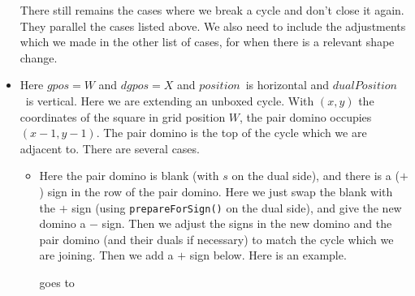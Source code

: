 \documentclass[12pt]{article}
\numberwithin{equation}{section}
\newcommand{\horizontalDominoRSShift}[4]{\filldraw [dominoRSStyle] (#2 - 1 + #4 + \eps, #1 - 1 + \eps) rectangle + (2 - \teps, 1 -\teps) node [dominoText] {$#3$};}
\newcommand{\verticalDominoRSShift}[4]{\filldraw [dominoRSStyle] (#2 - 1 + #4 + \eps,  #1 - 1 + \eps) rectangle + (1 - \teps,2 -\teps) node [dominoText] {$#3$};}
\newcommand{\pos}{$position$}
\newcommand{\dpos}{$dualPosition$}
\begin{document}
\begin{itemize}
    There still remains the cases where we break a cycle and don't close it again.
    They parallel the cases listed above.
    We also need to include the adjustments which we made in the other list of cases, for when there is a relevant shape change.

    \item Here $gpos = W$ and $dgpos = X$ and \pos\ is horizontal and \dpos\ is vertical.
    Here we are extending an unboxed cycle.
    With $(x, y)$ the coordinates of the square in grid position $W$, the pair domino occupies $(x - 1, y - 1)$.
    The pair domino is the top of the cycle which we are adjacent to.
    There are several cases.
    \begin{itemize}
      \item Here the pair domino is blank (with $s$ on the dual side), and there is a ($+$) sign in the row of the pair domino.
      Here we just swap the blank with the $+$ sign (using \texttt{prepareForSign()} on the dual side), and give the new domino a $-$ sign.
      Then we adjust the signs in the new domino and the pair domino (and their duals if necessary) to match the cycle which we are joining.
      Then we add a $+$ sign below.
      Here is an example.
      \begin{figure}[H]
        \centering
      \end{figure}
      goes to
      \begin{figure}[H]

\end{figure}
\end{itemize}
\end{itemize}
\end{document}
